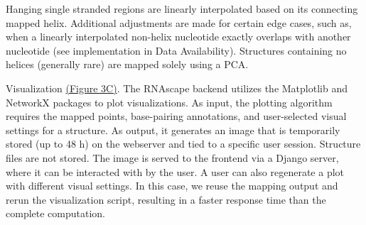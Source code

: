 Hanging single stranded regions are linearly interpolated based on its connecting mapped helix. Additional adjustments are made for certain edge cases, such as, when a linearly interpolated non-helix nucleotide exactly overlaps with another nucleotide (see implementation in Data Availability). Structures containing no helices (generally rare) are mapped solely using a PCA.

Visualization  \hyperref[fig:rnascape3]{(Figure 3C)}. The RNAscape backend utilizes the Matplotlib \citep{Hunter2007,} and NetworkX \citep{Hagberg2008} packages to plot visualizations. As input, the plotting algorithm requires the mapped points, base-pairing annotations, and user-selected visual settings for a structure. As output, it generates an image that is temporarily stored (up to 48 h) on the webserver and tied to a specific user session. Structure files are not stored. The image is served to the frontend via a Django \citep{Django2019} server, where it can be interacted with by the user. A user can also regenerate a plot with different visual settings. In this case, we reuse the mapping output and rerun the visualization script, resulting in a faster response time than the complete computation.
